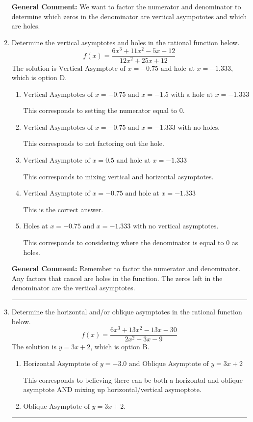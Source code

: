 \documentclass{extbook}[14pt]
\newcommand{\litem}[1]{\item #1

\rule{\textwidth}{0.4pt}}
\begin{document}
\begin{enumerate}
{\textbf{General Comment:} We want to factor the numerator and denominator to determine which zeros in the denominator are vertical asympototes and which are holes.
}
\litem{
Determine the vertical asymptotes and holes in the rational function below.
\[ f(x) = \frac{6x^{3} +11 x^{2} -5 x -12}{12x^{2} +25 x + 12} \]The solution is \( \text{Vertical Asymptote of } x = -0.75 \text{ and hole at } x = -1.333 \), which is option D.\begin{enumerate}[label=\Alph*.]
\item \( \text{Vertical Asymptotes of } x = -0.75 \text{ and } x = -1.5 \text{ with a hole at } x = -1.333 \)

This corresponds to setting the numerator equal to 0.
\item \( \text{Vertical Asymptotes of } x = -0.75 \text{ and } x = -1.333 \text{ with no holes.} \)

This corresponds to not factoring out the hole.
\item \( \text{Vertical Asymptote of } x = 0.5 \text{ and hole at } x = -1.333 \)

This corresponds to mixing vertical and horizontal asymptotes.
\item \( \text{Vertical Asymptote of } x = -0.75 \text{ and hole at } x = -1.333 \)

This is the correct answer.
\item \( \text{Holes at } x = -0.75 \text{ and } x = -1.333 \text{ with no vertical asymptotes.} \)

This corresponds to considering where the denominator is equal to 0 as holes.
\end{enumerate}

\textbf{General Comment:} Remember to factor the numerator and denominator. Any factors that cancel are holes in the function. The zeros left in the denominator are the vertical asymptotes.
}
\litem{
Determine the horizontal and/or oblique asymptotes in the rational function below.
\[ f(x) = \frac{6x^{3} +13 x^{2} -13 x -30}{2x^{2} +3 x -9} \]The solution is \( y = 3x + 2 \), which is option B.\begin{enumerate}[label=\Alph*.]
\item \( \text{Horizontal Asymptote of } y = -3.0 \text{ and Oblique Asymptote of } y = 3x + 2 \)

This corresponds to believing there can be both a horizontal and oblique asymptote AND mixing up horizontal/vertical asymoptote.
\item \( \text{Oblique Asymptote of } y = 3x + 2. \)


\end{enumerate}}
\end{enumerate}
\end{document}
